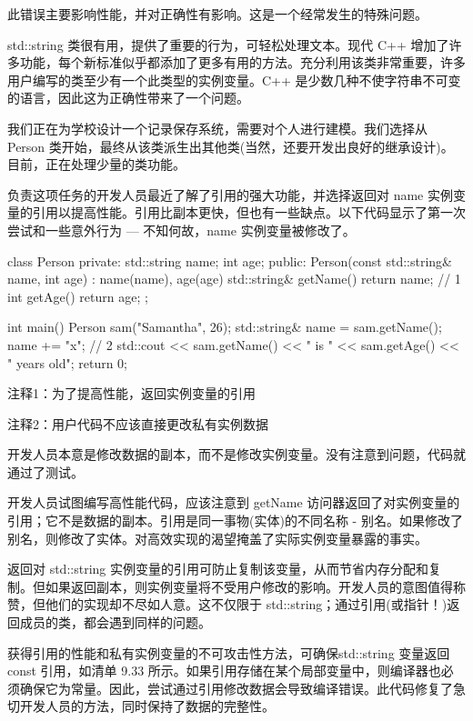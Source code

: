 此错误主要影响性能，并对正确性有影响。这是一个经常发生的特殊问题。

std::string 类很有用，提供了重要的行为，可轻松处理文本。现代 C++ 增加了许多功能，每个新标准似乎都添加了更多有用的方法。充分利用该类非常重要，许多用户编写的类至少有一个此类型的实例变量。C++ 是少数几种不使字符串不可变的语言，因此这为正确性带来了一个问题。


我们正在为学校设计一个记录保存系统，需要对个人进行建模。我们选择从 Person 类开始，最终从该类派生出其他类(当然，还要开发出良好的继承设计)。目前，正在处理少量的类功能。

负责这项任务的开发人员最近了解了引用的强大功能，并选择返回对 name 实例变量的引用以提高性能。引用比副本更快，但也有一些缺点。以下代码显示了第一次尝试和一些意外行为 — 不知何故，name 实例变量被修改了。


\begin{cpp}
class Person {
private:
  std::string name;
  int age;
public:
  Person(const std::string& name, int age) : name(name), age(age) {}
  std::string& getName() { return name; } // 1
  int getAge() { return age; }
};

int main() {
  Person sam("Samantha", 26);
  std::string& name = sam.getName();
  name += "x"; // 2
  std::cout << sam.getName() << " is " << sam.getAge() << " years old\n";
  return 0;
}
\end{cpp}

{\footnotesize
注释1：为了提高性能，返回实例变量的引用

注释2：用户代码不应该直接更改私有实例数据
}

开发人员本意是修改数据的副本，而不是修改实例变量。没有注意到问题，代码就通过了测试。


开发人员试图编写高性能代码，应该注意到 getName 访问器返回了对实例变量的引用；它不是数据的副本。引用是同一事物(实体)的不同名称 - 别名。如果修改了别名，则修改了实体。对高效实现的渴望掩盖了实际实例变量暴露的事实。


返回对 std::string 实例变量的引用可防止复制该变量，从而节省内存分配和复制。但如果返回副本，则实例变量将不受用户修改的影响。开发人员的意图值得称赞，但他们的实现却不尽如人意。这不仅限于 std::string；通过引用(或指针！)返回成员的类，都会遇到同样的问题。

获得引用的性能和私有实例变量的不可攻击性方法，可确保std::string 变量返回 const 引用，如清单 9.33 所示。如果引用存储在某个局部变量中，则编译器也必须确保它为常量。因此，尝试通过引用修改数据会导致编译错误。此代码修复了急切开发人员的方法，同时保持了数据的完整性。

